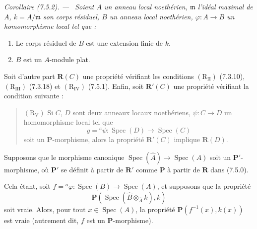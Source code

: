 \documentclass[10pt,oneside]{book}
\newenvironment{corollary}[1][]{%
  \par\medskip\noindent\itshape Corollaire (#1). ---\ }{\par}
\begin{document}
\begin{corollary}[7.5.2]
\label{IV.2.s7.5.2-fr}
Soient $A$ un anneau local noethérien, $\mathfrak m$ l'idéal maximal de $A$,
$k=A/\mathfrak m$ son corps résiduel, $B$ un anneau local noethérien,
$\varphi:A\to B$ un homomorphisme local tel que :
\begin{enumerate}
\item[\emph{(i)}] Le corps résiduel de $B$ est une extension finie de $k$.
\item[\emph{(ii)}] $B$ est un $A$-module plat.
\end{enumerate}
Soit d'autre part $\boldsymbol R(C)$ une propriété vérifiant les conditions
$(\mathrm R_{\mathrm{II}})$ (7.3.10), $(\mathrm R_{\mathrm{III}})$
(7.3.18) et $(\mathrm R_{\mathrm{IV}})$ (7.5.1). Enfin, soit
$\boldsymbol R'(C)$ une propriété vérifiant la condition suivante :
\begin{quote}
$(\mathrm R_{\mathrm V})$ Si $C$, $D$ sont deux anneaux locaux noethériens,
$\psi:C\to D$ un homomorphisme local tel que
\[
g={}^a\psi:\operatorname{Spec}(D)\to\operatorname{Spec}(C)
\]
soit un $\boldsymbol P$-morphisme, alors la propriété
$\boldsymbol R'(C)$ implique $\boldsymbol R(D)$.
\end{quote}
Supposons que le morphisme canonique
$\operatorname{Spec}(\widehat A)\to\operatorname{Spec}(A)$ soit un
$\boldsymbol P'$-morphisme, où $\boldsymbol P'$ se définit à partir de
$\boldsymbol R'$ comme $\boldsymbol P$ à partir de $\boldsymbol R$ dans
(7.5.0).

Cela étant, soit
$f={}^a\varphi:\operatorname{Spec}(B)\to\operatorname{Spec}(A)$, et
supposons que la propriété
\[
\boldsymbol P(\operatorname{Spec}(\widehat B
\otimes_{\widehat A}k),k)
\]
soit vraie. Alors, pour tout $x\in\operatorname{Spec}(A)$, la propriété
$\boldsymbol P(f^{-1}(x),k(x))$ est vraie (autrement dit, $f$ est un
$\boldsymbol P$-morphisme).
\end{corollary}
\end{document}
